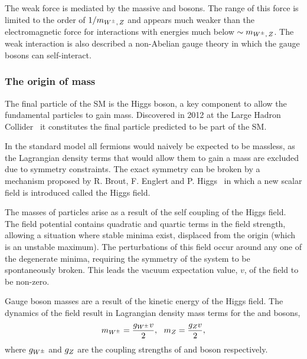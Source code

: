 The weak force is mediated by the massive \Wpm and \Z bosons. The range of this force is limited to the order of $1/m_{{W^\pm},\,{Z}}$ and appears much weaker than the electromagnetic force for interactions with energies much below $\sim m_{{W^\pm},\,{Z}}$. The weak interaction is also described a non-Abelian gauge theory in which the gauge bosons can self-interact. 



\subsubsection{The origin of mass}
The final particle of the SM is the Higgs boson, a key component to allow the fundamental particles to gain mass. Discovered in 2012 at the Large Hadron Collider~\cite{20121,201230} it constitutes the final particle predicted to be part of the SM. 

In the standard model all fermions would naively be expected to be massless, as the Lagrangian density terms that would allow them to gain a mass are excluded due to symmetry constraints. The exact symmetry can be broken by a mechanism proposed by R. Brout, F. Englert and P. Higgs~\cite{PhysRevLett.13.508,PhysRevLett.13.321} in which a new scalar field is introduced called the Higgs field. 

The masses of particles arise as a result of the self coupling of the Higgs field. The field potential contains quadratic and quartic terms in the field strength, allowing a situation where stable minima exist, displaced from the origin (which is an unstable maximum). The perturbations of this field occur around any one of the degenerate minima, requiring the symmetry of the system to be spontaneously broken. This leads the vacuum expectation value, $v$, of the field to be non-zero.   

Gauge boson masses are a result of the kinetic energy of the Higgs field. The dynamics of the field result in Lagrangian density mass terms for the \Wpm and \Z bosons,
\begin{equation}
m_{{W^\pm}} = \frac{g_{{W^\pm}}v}{2}, ~~m_{{Z}} = \frac{g_{{Z}}v}{2},
\end{equation}
where $g_{{W^\pm}}$ and $g_{{Z}}$ are the coupling strengths of \Wpm and \Z boson respectively.


